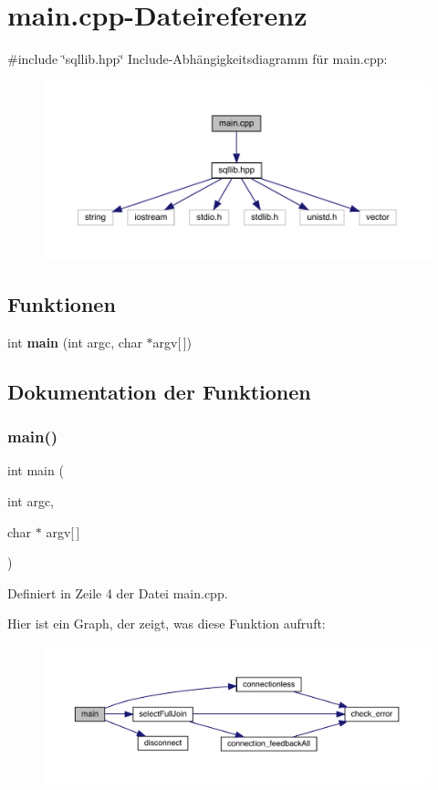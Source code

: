 \section{main.\+cpp-\/\+Dateireferenz}
\label{main_8cpp}
{\ttfamily \#include \char`\"{}sqllib.\+hpp\char`\"{}}\newline
Include-\/\+Abhängigkeitsdiagramm für main.\+cpp\+:\nopagebreak
\begin{figure}[H]
\begin{center}
\leavevmode
\includegraphics[width=350pt]{main_8cpp__incl}
\end{center}
\end{figure}
\subsection*{Funktionen}
\begin{DoxyCompactItemize}
\item 
int \textbf{ main} (int argc, char $\ast$argv[$\,$])
\end{DoxyCompactItemize}


\subsection{Dokumentation der Funktionen}
\mbox{\label{main_8cpp_a0ddf1224851353fc92bfbff6f499fa97}} 
\subsubsection{main()}
{\footnotesize\ttfamily int main (\begin{DoxyParamCaption}\item[{int}]{argc,  }\item[{char $\ast$}]{argv[$\,$] }\end{DoxyParamCaption})}



Definiert in Zeile 4 der Datei main.\+cpp.

Hier ist ein Graph, der zeigt, was diese Funktion aufruft\+:
\nopagebreak
\begin{figure}[H]
\begin{center}
\leavevmode
\includegraphics[width=350pt]{main_8cpp_a0ddf1224851353fc92bfbff6f499fa97_cgraph}
\end{center}
\end{figure}
